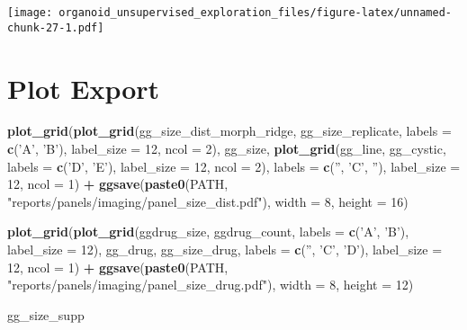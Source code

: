 \documentclass[
]{article}
\newenvironment{Shaded}{\begin{snugshade}}{\end{snugshade}}
\newcommand{\DataTypeTok}[1]{\textcolor[rgb]{0.13,0.29,0.53}{#1}}
\newcommand{\DecValTok}[1]{\textcolor[rgb]{0.00,0.00,0.81}{#1}}
\newcommand{\KeywordTok}[1]{\textcolor[rgb]{0.13,0.29,0.53}{\textbf{#1}}}
\newcommand{\NormalTok}[1]{#1}
\newcommand{\OperatorTok}[1]{\textcolor[rgb]{0.81,0.36,0.00}{\textbf{#1}}}
\newcommand{\StringTok}[1]{\textcolor[rgb]{0.31,0.60,0.02}{#1}}
\begin{document}
\texttt{[image: organoid\_unsupervised\_exploration\_files/figure-latex/unnamed-chunk-27-1.pdf]}

\hypertarget{plot-export}{%
\section{Plot Export}\label{plot-export}}

\begin{Shaded}
\begin{Highlighting}[]
\KeywordTok{plot_grid}\NormalTok{(}\KeywordTok{plot_grid}\NormalTok{(gg_size_dist_morph_ridge, gg_size_replicate, }\DataTypeTok{labels =} \KeywordTok{c}\NormalTok{(}\StringTok{'A'}\NormalTok{, }\StringTok{'B'}\NormalTok{), }\DataTypeTok{label_size =} \DecValTok{12}\NormalTok{, }\DataTypeTok{ncol =} \DecValTok{2}\NormalTok{),}
\NormalTok{          gg_size,}
          \KeywordTok{plot_grid}\NormalTok{(gg_line, gg_cystic, }\DataTypeTok{labels =} \KeywordTok{c}\NormalTok{(}\StringTok{'D'}\NormalTok{, }\StringTok{'E'}\NormalTok{), }\DataTypeTok{label_size =} \DecValTok{12}\NormalTok{, }\DataTypeTok{ncol =} \DecValTok{2}\NormalTok{),}
          \DataTypeTok{labels =} \KeywordTok{c}\NormalTok{(}\StringTok{''}\NormalTok{, }\StringTok{'C'}\NormalTok{, }\StringTok{''}\NormalTok{), }\DataTypeTok{label_size =} \DecValTok{12}\NormalTok{, }\DataTypeTok{ncol =} \DecValTok{1}\NormalTok{) }\OperatorTok{+}
\StringTok{  }\KeywordTok{ggsave}\NormalTok{(}\KeywordTok{paste0}\NormalTok{(PATH, }\StringTok{"reports/panels/imaging/panel_size_dist.pdf"}\NormalTok{), }\DataTypeTok{width =} \DecValTok{8}\NormalTok{, }\DataTypeTok{height =} \DecValTok{16}\NormalTok{)}

\KeywordTok{plot_grid}\NormalTok{(}\KeywordTok{plot_grid}\NormalTok{(ggdrug_size, ggdrug_count, }\DataTypeTok{labels =} \KeywordTok{c}\NormalTok{(}\StringTok{'A'}\NormalTok{, }\StringTok{'B'}\NormalTok{), }\DataTypeTok{label_size =} \DecValTok{12}\NormalTok{),}
\NormalTok{          gg_drug,}
\NormalTok{          gg_size_drug,}
          \DataTypeTok{labels =} \KeywordTok{c}\NormalTok{(}\StringTok{''}\NormalTok{, }\StringTok{'C'}\NormalTok{, }\StringTok{'D'}\NormalTok{), }\DataTypeTok{label_size =} \DecValTok{12}\NormalTok{, }\DataTypeTok{ncol =} \DecValTok{1}\NormalTok{) }\OperatorTok{+}
\StringTok{  }\KeywordTok{ggsave}\NormalTok{(}\KeywordTok{paste0}\NormalTok{(PATH, }\StringTok{"reports/panels/imaging/panel_size_drug.pdf"}\NormalTok{), }\DataTypeTok{width =} \DecValTok{8}\NormalTok{, }\DataTypeTok{height =} \DecValTok{12}\NormalTok{)}

\NormalTok{gg_size_supp}
\end{Highlighting}
\end{Shaded}
\end{document}

